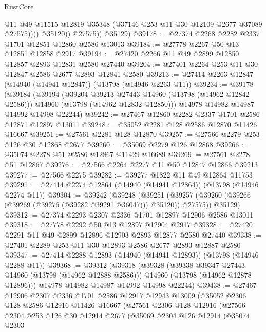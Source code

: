 \begin{lexlean}{RustCore}
\begin{coremodule}
                    @11
                    @49
                    @11515
                    @12819
                    @35348
                    (@37146 @253 @11 @30 @12109 @2677 @37089 @27575))))
              @35120))
          @27575))
      @35129)
@39178 := @27374 @2268 @2282 @2337 @1701 @12851 @12860 @2586 @13013
@39184 := @27778 @2267 @50 @13 @12851 @12858 @2917
@39194 := @27420 @2266 @11 @49 @2899 @12850 @12857 @2893 @12831 @2580 @27440
@39204 := @27401 @2264 @253 @11 @30 @12847 @2586 @2677 @2893 @12841 @2580
@39213 := @27414 @2263 @12847 (@14940 (@14941 @12847)) (@13798 (@14946 @2263 @11))
@39234 := @39178
    (@39184
      (@39194
        (@39204 @39213 @27443 @14960 (@13798 (@14962 @12842 @2586)))
        @14960
        (@13798 (@14962 @12832 @12850)))
      @14978
      @14982
      @14987
      @14992
      @14998
      @22244)
@39242 := @27467 @12860 @2282 @2337 @1701 @2586 @12871 @12897 @13011
@39248 := @35052 @2281 @128 @2586 @12870 @11426 @16667
@39251 := @27561 @2281 @128 @12870
@39257 := @27566 @2279 @253 @126 @30 @12868 @2677
@39260 := @35069 @2279 @126 @12868
@39266 := @35074 @2278 @51 @2586 @12867 @11429 @16689
@39269 := @27561 @2278 @51 @12867
@39276 := @27566 @2264 @2277 @11 @50 @12847 @12866 @39213
@39277 := @27566 @2275
@39282 := @39277 @1822 @11 @49 @12864 @11753
@39291 := @27414 @2274 @12864 (@14940 (@14941 @12864)) (@13798 (@14946 @2274 @11))
@39304 := @39242
    (@39248
      (@39251 (@39257 (@39260 (@39266 (@39269 (@39276 (@39282 @39291 @36047))) @35120)) @27575))
      @35129)
@39312 := @27374 @2293 @2307 @2336 @1701 @12897 @12906 @2586 @13011
@39318 := @27778 @2292 @50 @13 @12897 @12904 @2917
@39328 := @27420 @2291 @11 @49 @2899 @12896 @12903 @2893 @12877 @2580 @27440
@39338 := @27401 @2289 @253 @11 @30 @12893 @2586 @2677 @2893 @12887 @2580
@39347 := @27414 @2288 @12893 (@14940 (@14941 @12893)) (@13798 (@14946 @2288 @11))
@39368 := @39312
    (@39318
      (@39328
        (@39338 @39347 @27443 @14960 (@13798 (@14962 @12888 @2586)))
        @14960
        (@13798 (@14962 @12878 @12896)))
      @14978
      @14982
      @14987
      @14992
      @14998
      @22244)
@39438 := @27467
    @12906
    @2307
    @2336
    @1701
    @2586
    @12917
    @12943
    @13009
    (@35052
      @2306
      @128
      @2586
      @12916
      @11426
      @16667
      (@27561
        @2306
        @128
        @12916
        (@27566
          @2304
          @253
          @126
          @30
          @12914
          @2677
          (@35069
            @2304
            @126
            @12914
            (@35074
              @2303

\end{coremodule}
\end{lexlean}
